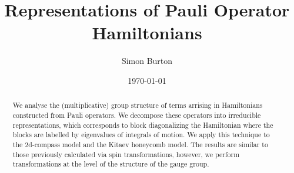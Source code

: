 \documentclass[12pt,notitlepage,longbibliography,nofootinbib,tightenlines]{revtex4}
\begin{document}
\title{Representations of Pauli Operator Hamiltonians}

\author{Simon Burton}

\date{\today}


\begin{abstract}
We analyse the (multiplicative) group structure of terms arrising
in Hamiltonians constructed from Pauli operators.
We decompose these operators into irreducible 
representations, which corresponds to block diagonalizing
the Hamiltonian where the blocks are labelled by
eigenvalues of integrals of motion.
We apply this technique to the 2d-compass model
and the Kitaev honeycomb model.
The results are similar to those previously 
calculated via spin transformations,
however, we perform transformations at
the level of the structure of the gauge group.
\end{abstract}

\maketitle


\def\Complex{\mathbb{C}}
\def\Z{\mathbb{Z}}
\def\Ham{\mathcal{H}}
\def\Pauli{\mathcal{P}}
\def\Spec{\mbox{Spec}}
\def\Proveit{{\it (Proof??)}}
\def\GL{\mathrm{GL}}
\def\half{\frac{1}{2}}

%
%


\end{document}
